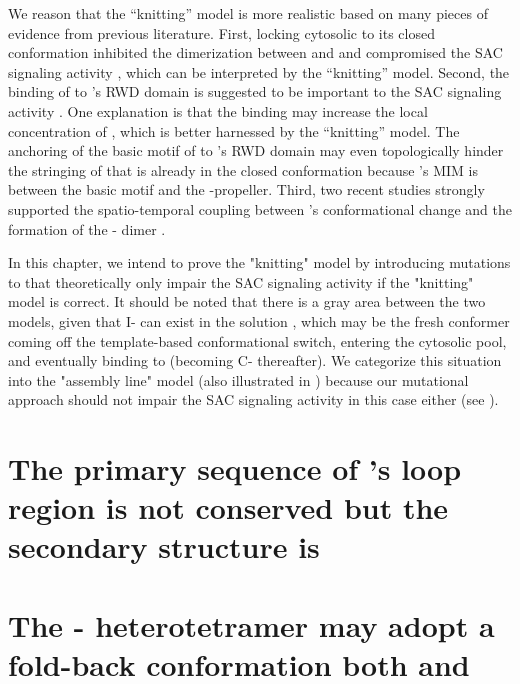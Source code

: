 We reason that the ``knitting'' model is more realistic based on many pieces of evidence from previous literature. First, locking cytosolic  to its closed conformation inhibited the dimerization between  and  and compromised the SAC signaling activity \cite{Ma+Poon2016, Ma+Poon2018, Kim2018}, which can be interpreted by the ``knitting'' model. Second, the binding of  to 's RWD domain is suggested to be important to the SAC signaling activity \cite{Kruse2014, SpMad1, Faesen2017, Ji2017eLife}. One explanation is that the binding may increase the local concentration of , which is better harnessed by the ``knitting'' model. The anchoring of the basic motif of  to 's RWD domain may even topologically hinder the stringing of  that is already in the closed conformation because 's MIM is between the basic motif and the \textbeta{}-propeller. Third, two recent studies strongly supported the spatio-temporal coupling between 's conformational change and the formation of the - dimer \cite{BUB1-CDC20-MAD1, Tripartite}.

In this chapter, we intend to prove the "knitting" model by introducing mutations to  that theoretically only impair the SAC signaling activity if the "knitting" model is correct. It should be noted that there is a gray area between the two models, given that I- can exist in the solution \cite{I-MAD2}, which may be the fresh  conformer coming off the template-based conformational switch, entering the cytosolic pool, and eventually binding to  (becoming C- thereafter). We categorize this situation into the "assembly line" model (also illustrated in ) because our mutational approach should not impair the SAC signaling activity in this case either (see ).

\section{The primary sequence of 's loop region is not conserved but the secondary structure is}

\section{The - heterotetramer may adopt a fold-back conformation both  and }

